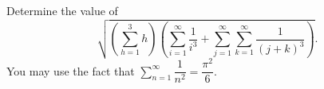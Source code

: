 Determine the value of
\[\sqrt{\left(\sum_{h=1}^{3}h\right)\left(\sum_{i=1}^{\infty}\dfrac{1}{i^3}+\sum_{j=1}^{\infty}\sum_{k=1}^{\infty}\dfrac{1}{(j+k)^3}\right)}.\]
You may use the fact that $\displaystyle\sum_{n=1}^{\infty}\dfrac1{n^2}=\dfrac{\pi^2}{6}$.
